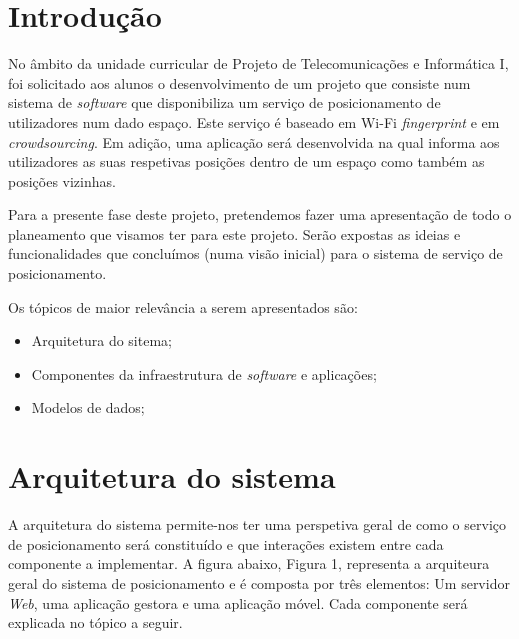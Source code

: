 \documentclass[12pt]{article} %
\begin{document}
\section{Introdução}
No âmbito da unidade curricular de Projeto de Telecomunicações e Informática I, foi solicitado aos alunos o desenvolvimento de um projeto que consiste num sistema de \textit{software} que disponibiliza um serviço de posicionamento de utilizadores num dado espaço. Este serviço é baseado em Wi-Fi \textit{fingerprint} e em \textit{crowdsourcing}. Em adição, uma aplicação será desenvolvida na qual informa aos utilizadores as suas respetivas posições dentro de um espaço como também as posições vizinhas.\par

Para a presente fase deste projeto, pretendemos fazer uma apresentação de todo o planeamento que visamos ter para este projeto. Serão expostas as ideias e funcionalidades que concluímos (numa visão inicial) para o sistema de serviço de posicionamento.\par
\text{}\par
Os tópicos de maior relevância a serem apresentados são:

\begin{center}
	\begin{minipage}{3.0\linewidth}
		\begin{itemize}
			\item Arquitetura do sitema;
			\item Componentes da infraestrutura de \textit{software} e aplicações;
			\item Modelos de dados;
		\end{itemize}
	 \end{minipage}
\end{center}

\pagebreak

\section{Arquitetura do sistema}
A arquitetura do sistema permite-nos ter uma perspetiva geral de como o serviço de posicionamento será constituído e que interações existem entre cada componente a implementar. A figura abaixo, Figura 1, representa a arquiteura geral do sistema de posicionamento e é composta por três elementos: Um servidor \textit{Web}, uma aplicação gestora e uma aplicação móvel. Cada componente será explicada no tópico a seguir.\par
\end{document}
